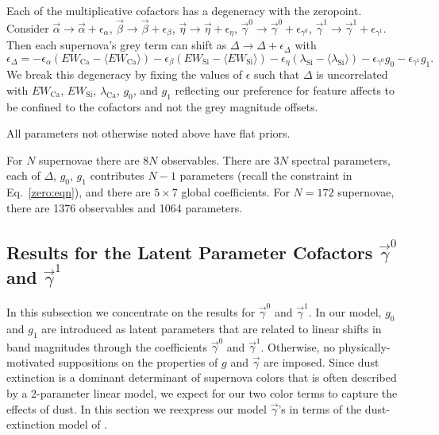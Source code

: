 \documentclass[trackchanges]{aastex62}   	%
\begin{document}
Each of the multiplicative cofactors has a degeneracy with the zeropoint.  Consider
$\vec{\alpha} \rightarrow \vec{\alpha} +   \epsilon_{\alpha}$,
$\vec{\beta} \rightarrow \vec{\beta} +   \epsilon_{\beta}$,
$\vec{\eta} \rightarrow \vec{\eta} +   \epsilon_{\eta}$,
$\vec{\gamma}^0 \rightarrow \vec{\gamma}^0 +   \epsilon_{\gamma^0}$,
$\vec{\gamma}^1 \rightarrow \vec{\gamma}^1 +   \epsilon_{\gamma^1}$.
Then
each supernova's grey term can shift as
$\Delta \rightarrow \Delta  + \epsilon_\Delta$
with
$$
\epsilon_\Delta  = -  \epsilon_{\alpha} (EW_{\text{Ca}}-\langle EW_{\text{Ca}}\rangle)- 
 \epsilon_{\beta} (EW_{\mathrm{Si}}-\langle EW_{\mathrm{Si}}\rangle) -  \epsilon_{\eta} (\lambda_{\mathrm{Si}}-\langle \lambda_{\mathrm{Si}}\rangle)
- \epsilon_{\gamma^0}g_0 -  \epsilon_{\gamma^1}g_1.
$$
We break this degeneracy by fixing the values of $\epsilon$ such that $\Delta$ is
uncorrelated with  $EW_{\text{Ca}}$, $EW_{\mathrm{Si}}$, $\lambda_{\text{Ca}}$,
$g_0$, and $g_1$ reflecting
our preference for feature affects to be confined to the cofactors and not the grey magnitude offsets.

All parameters not  otherwise noted above have flat priors.

For $N$ supernovae there are $8N$ observables.  There are $3N$ spectral parameters, each of
$\Delta$, $g_0$, $g_1$ contributes $N-1$ parameters
(recall the constraint in Eq.~\ref{zero:eqn}),  and there are $5 \times 7$ global coefficients.
For $N=172$ supernovae, there are 1376 observables and 1064  parameters.


\subsection{Results for the Latent Parameter Cofactors  $\vec{\gamma}^0$ and $\vec{\gamma}^1$  }
\label{results1:sec}
In this subsection we concentrate on the results for $\vec{\gamma}^0$ and $\vec{\gamma}^1$.
In our model, $g_0$ and $g_1$ are introduced as latent parameters that are related to linear shifts in band magnitudes through
the  coefficients $\vec{\gamma}^0$ and
$\vec{\gamma}^1$.  Otherwise, no physically-motivated suppositions on the properties of $g$ and $\vec{\gamma}$ are imposed.
Since dust extinction is a dominant determinant of supernova colors that is often described by a 2-parameter linear model, we expect
for our two  color terms to capture the effects of dust.
In this section we reexpress our model $\vec{\gamma}$'s in terms of
the dust-extinction model of \citet{1999PASP..111...63F} .
\end{document}
